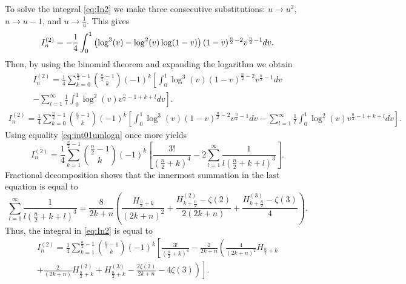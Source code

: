 To solve the integral \cref{eq:In2} we make three consecutive
substitutions: $u\to u^2$, $u\to u-1$, and $u\to\frac{1}{u}$. This gives
\[
    I_n^{(2)}=
    -\frac{1}{4} \int_0^1 
        \left(\log^3(v)-\log^2(v)\log(1-v) \right) 
        (1-v)^{\frac{n}2-2} v^{\frac{n}2-1} dv. \\
\]
Then, by using the binomial theorem and expanding the logarithm we obtain
\ifsiam
\begin{multline*}
    I_n^{(2)}={}
\frac{1}{4} \sum_{k=0}^{\frac{n}{2}-1} \binom{\frac{n}{2}-1}k
        (-1)^k \left[ 
          \int_0^1 \log^3(v) (1-v)^{\frac{n}2-2} v^{\frac{n}2-1} dv \right. \\
        \left. 
        -\sum_{l=1}^\infty \frac1l \int_0^1 \log^2(v) v^{\frac{n}2-1+k+l} dv 
    \right].
\end{multline*}
\else
\begin{multline*}
    I_n^{(2)}={}
\frac{1}{4} \sum_{k=0}^{\frac{n}{2}-1} \binom{\frac{n}{2}-1}k
        (-1)^k \left[ 
          \int_0^1 \log^3(v) (1-v)^{\frac{n}2-2} v^{\frac{n}2-1} dv
        -\sum_{l=1}^\infty \frac1l \int_0^1 \log^2(v) v^{\frac{n}2-1+k+l} dv 
    \right].
\end{multline*}
\fi
Using equality \cref{eq:int01umlogn} once more yields
\begin{equation*}
    I_n^{(2)}={}
\frac{1}{4} \sum_{k=1}^{\frac{n}{2}-1} \binom{\frac{n}{2}-1}k
    (-1)^k \left[ \frac{3!}{(\frac{n}{2}+k)^4}
     -2\sum_{l=1}^\infty \frac1{l(\frac{n}2+k+l)^3}\right].
\end{equation*}
Fractional decomposition shows that the innermost summation in the last
equation is equal to 
\begin{equation*}
    \sum_{l=1}^\infty \frac1{l(\frac{n}2+k+l)^3}
        = \frac{8}{2k+n} \left(\frac{H_{\frac{n}{2} + k}}{(2k+n)^2} +
            \frac{H^{(2)}_{k+\frac{n}{2}} - \zeta(2)}{2(2k+n)} +
            \frac{H^{(3)}_{k+\frac{n}{2}} - \zeta(3)}4 
        \right).
\end{equation*}
%
Thus, the integral in \cref{eq:In2} is equal to
\begin{multline*}
    I_n^{(2)} = \frac{1}{4} \sum_{k=1}^{\frac{n}{2}-1} 
        \binom{\frac{n}{2}-1}k (-1)^k 
        \left[ \frac{3!}{(\frac{n}{2}+k)^4} \right.  
        - \frac{2}{2k+n} 
            \left(\frac{4}{(2k+n)^2} H_{\frac{n}{2}+k} \right. \\ 
            \left.\left. + \frac{2}{(2k+n)} H^{(2)}_{\frac{n}{2}+k} 
            + H^{(3)}_{\frac{n}{2}+k} - \frac{2\zeta(2)}{2k+n} - 4\zeta(3)
    \right)\right].
\end{multline*}

